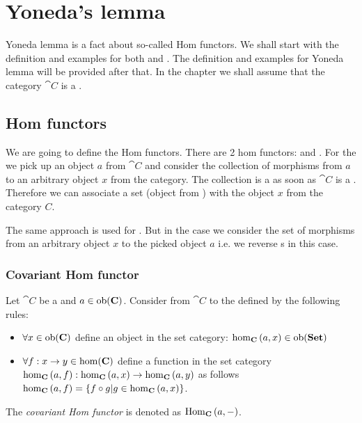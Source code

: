 \chapter{Yoneda's lemma}
\label{sec:yoneda}
Yoneda lemma is a fact about so-called Hom functors. We shall start
with the definition and examples for both
 and . The
definition and examples for Yoneda lemma will be provided after that. 
In the chapter we shall assume that the category $\cat{C}$ is a
.

\section{Hom functors}

We are going to define the Hom functors. There are 2 hom functors:
 and
. For the
 we pick up an object $a$ from 
$\cat{C}$ and consider the collection of morphisms from $a$ to an
arbitrary object $x$ from the category. The collection is a
 as soon as $\cat{C}$ is a
. Therefore we can associate a
set (object from ) with the object $x$ from the
category $C$. 

The same approach is used for 
. But in the case we consider the set of
morphisms from an arbitrary object $x$ to the picked object $a$ i.e.
we reverse s in this case.

\subsection{Covariant Hom functor}
\begin{definition}
\label{def:cov_hom_functor}
Let $\cat{C}$ be a  and $a \in
\mathrm{ob}(\mathbf{C})$. Consider  from $\cat{C}$ to the
 defined by the following rules:
\begin{itemize}
\item $\forall x \in \mathrm{ob}(\mathbf{C})$ define an object in the set category:
  $\catmset[C]{a}{x} \in \catob{Set}$ 
\item $\forall f: x \to y \in \mathrm{hom}(\mathbf{C})$ define a function in the set category
  $\catmset[C]{a}{f}: \catmset[C]{a}{x} \to \catmset[C]{a}{y}$ as follows
  $\catmset[C]{a}{f} = \{f \circ g | g \in \catmset[C]{a}{x}\}$.
\end{itemize}  
The \textit{covariant Hom functor} is denoted as $\mathrm{Hom}_{\mathbf{C}}\left(a, -\right)$.
\end{definition}

